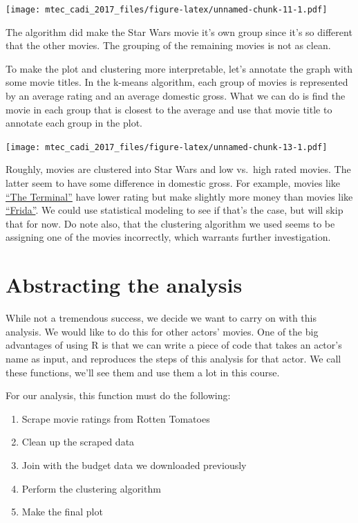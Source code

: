 \documentclass[12pt,]{book}
\providecommand{\tightlist}{%
  \setlength{\itemsep}{0pt}\setlength{\parskip}{0pt}}
\theoremstyle{definition}
\theoremstyle{definition}
\theoremstyle{definition}
\theoremstyle{remark}
\begin{document}
\texttt{[image: mtec\_cadi\_2017\_files/figure-latex/unnamed-chunk-11-1.pdf]}

The algorithm did make the Star Wars movie it's own group since it's so
different that the other movies. The grouping of the remaining movies is
not as clean.

To make the plot and clustering more interpretable, let's annotate the
graph with some movie titles. In the k-means algorithm, each group of
movies is represented by an average rating and an average domestic
gross. What we can do is find the movie in each group that is closest to
the average and use that movie title to annotate each group in the plot.

\texttt{[image: mtec\_cadi\_2017\_files/figure-latex/unnamed-chunk-13-1.pdf]}

Roughly, movies are clustered into Star Wars and low vs.~high rated
movies. The latter seem to have some difference in domestic gross. For
example, movies like
\href{https://www.rottentomatoes.com/m/1133499_1133499_terminal}{``The
Terminal''} have lower rating but make slightly more money than movies
like \href{https://www.rottentomatoes.com/m/frida}{``Frida''}. We could
use statistical modeling to see if that's the case, but will skip that
for now. Do note also, that the clustering algorithm we used seems to be
assigning one of the movies incorrectly, which warrants further
investigation.

\section{Abstracting the analysis}\label{abstracting-the-analysis}

While not a tremendous success, we decide we want to carry on with this
analysis. We would like to do this for other actors' movies. One of the
big advantages of using R is that we can write a piece of code that
takes an actor's name as input, and reproduces the steps of this
analysis for that actor. We call these functions, we'll see them and use
them a lot in this course.

For our analysis, this function must do the following:

\begin{enumerate}
\def\labelenumi{\arabic{enumi}.}
\tightlist
\item
  Scrape movie ratings from Rotten Tomatoes
\item
  Clean up the scraped data
\item
  Join with the budget data we downloaded previously
\item
  Perform the clustering algorithm
\item
  Make the final plot
\end{enumerate}
\end{document}
